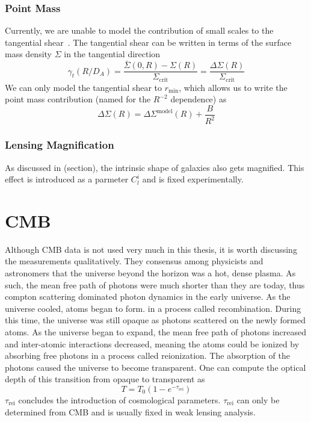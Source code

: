 \subsubsection{Point Mass}
Currently, we are unable to model the contribution of small scales to the tangential shear~\cite{maccrann_controlling_2020}. The tangential shear can be written in terms of the surface mass density $\Sigma$ in the tangential direction
\begin{equation}
	\gamma_t(R/D_A) = \frac{\bar\Sigma(0,R) - \Sigma(R)}{\Sigma_\mathrm{crit}} = \frac{\Delta\Sigma(R)}{\Sigma_\mathrm{crit}}
\end{equation}
We can only model the tangential shear to $r_\mathrm{min}$, which allows us to write the point mass contribution (named for the $R^{-2}$ dependence) as
\begin{equation}
	\Delta\Sigma(R) = \Delta\Sigma^{\mathrm{model}}(R) + \frac{B}{R^2}
\end{equation}
\subsubsection{Lensing Magnification}
As discussed in (section), the intrinsic shape of galaxies also gets magnified. This effect is introduced as a parmeter $C_l^i$ and is fixed experimentally.


\section{CMB}
Although CMB data is not used very much in this thesis, it is worth discussing the measurements qualitatively. They consensus among physicists and astronomers that the universe beyond the horizon was a hot, dense plasma. As such, the mean free path of photons were much shorter than they are today, thus compton scattering dominated photon dynamics in the early universe. As the universe cooled, atoms began to form. in a process called recombination. During this time, the universe was still opaque as photons scattered on the newly formed atoms. As the universe began to expand, the mean free path of photons increased and inter-atomic interactions decreased, meaning the atoms could be ionized by absorbing free photons in a process called reionization. The absorption of the photons caused the universe to become transparent. One can compute the optical depth of this transition from opaque to transparent as
\begin{equation}
	T = T_0(1-e^{-\tau_{\mathrm{rei}}})
\end{equation}
$\tau_{\mathrm{rei}}$ concludes the introduction of cosmological parameters. $\tau_{\mathrm{rei}}$ can only be determined from CMB and is usually fixed in weak lensing analysis.

